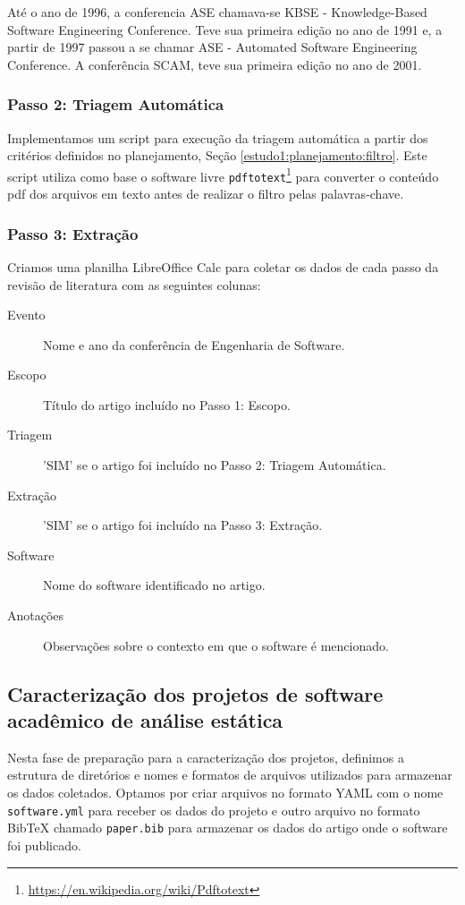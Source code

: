 Até o ano de 1996, a conferencia ASE chamava-se KBSE - Knowledge-Based Software
Engineering Conference. Teve sua primeira edição no ano de 1991 e, a partir de 1997 
passou a se chamar  ASE - Automated Software Engineering Conference.
A conferência SCAM, teve sua primeira edição no ano de 2001.

\subsubsection{Passo 2: Triagem Automática}

Implementamos um script para execução da triagem automática a partir dos
critérios definidos no planejamento, Seção \ref{estudo1:planejamento:filtro}.
Este script utiliza como base o software livre
\texttt{pdftotext}\footnote{\url{https://en.wikipedia.org/wiki/Pdftotext}} para
converter o conteúdo pdf dos arquivos em texto antes de realizar o filtro pelas
palavras-chave.

\subsubsection{Passo 3: Extração}

Criamos uma planilha LibreOffice Calc para coletar os dados de cada passo da
revisão de literatura com as seguintes colunas:

\begin{description}
  \item[Evento] Nome e ano da conferência de Engenharia de Software.
  \item[Escopo] Título do artigo incluído no Passo 1: Escopo.
  \item[Triagem] 'SIM' se o artigo foi incluído no Passo 2: Triagem Automática.
  \item[Extração] 'SIM' se o artigo foi incluído na Passo 3: Extração.
  \item[Software] Nome do software identificado no artigo.
  \item[Anotações] Observações sobre o contexto em que o software é mencionado.
\end{description}

\subsection{Caracterização dos projetos de software acadêmico de análise estática}

Nesta fase de preparação para a caracterização dos projetos, definimos a
estrutura de diretórios e nomes e formatos de arquivos utilizados para
armazenar os dados coletados. Optamos por criar arquivos no formato YAML com o
nome \texttt{software.yml} para receber os dados do projeto e outro arquivo no
formato BibTeX chamado \texttt{paper.bib} para armazenar os dados do artigo
onde o software foi publicado.

